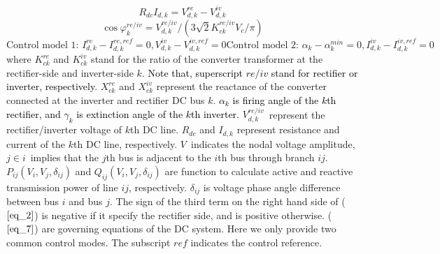 \documentclass[lettersize,journal]{IEEEtran}
\begin{document}
\begin{equation}
\label{eq_5}   
R_{dc}I_{d,k}=V_{d,k}^{re} - V_{d,k}^{iv}
\end{equation}
\begin{equation} 
\label{eq_6}
{\cos\varphi_{k} ^{re/iv} = {V_{d,k}^{re/iv}}  / ({{3\sqrt{2}}K_{ck}^{re/iv} V_{c}} / {\pi})}
\end{equation}
\begin{subequations}     
\label{eq_7}
\begin{equation} 
\label{eq_7a}
 \text{Control model 1: } {I_{d,k}^{re}\!-\!I_{d,k}^{re,ref}\! = \!0},  {V_{d,k}^{iv}\!-\!V_{d,k}^{iv,ref} = 0}
\end{equation}
\begin{equation}  
\label{eq_7b}
\text{Control model 2: } 
 {\alpha_{k} - {\alpha}_{k}^{min} =  0,I_{d, k}^{iv}  -   I _{d, k}^{iv,ref}  =  0 }
\end{equation}
\end{subequations}
where $ \textit{K}_{ck}^{re} $ and $ \textit{K}_{ck}^{iv} $ stand for the ratio of the converter transformer at the rectifier-side and inverter-side $k$. \textcolor{black}{Note that, superscript $re/iv$ stand for rectifier or inverter, respectively.} $\textit{X}_{ck}^{re} $ and $\textit{X}_{ck}^{iv} $ represent the reactance of the  converter connected at the inverter and rectifier DC bus $k$. \textcolor{black}{ $\alpha_{k}$ is firing angle of the $k$th rectifier, and $\gamma_{k}$ is extinction angle of the $k$th inverter.} $V_{d,k}^{re / iv}$\ represent the rectifier/inverter voltage of $k$th DC line. $R_{dc}$ and $I_{d,k}$ represent resistance and current of the $k$th DC line, respectively. $V$\ indicates the nodal voltage amplitude, $j\in i$\ implies that the $j$th bus is adjacent to the $i$th bus through branch $ij$. $P_{ij}(V_{i},V_{j},\delta_{ij})$ and $Q_{ij}(V_{i},V_{j},\delta_{ij})$ are function to calculate active and reactive transmission power of line $ij$, respectively. $ \delta_{ij}$ is voltage phase angle difference between bus $i$ and bus $j$. The sign of the third term on the right hand side of ($\ref{eq_2}$) is negative if it specify the rectifier side, and is positive otherwise. ($\ref{eq_7}$) are governing equations of the DC system. Here we only provide two common control modes. The subscript ${ref}$ indicates the control reference.  
\end{document}
